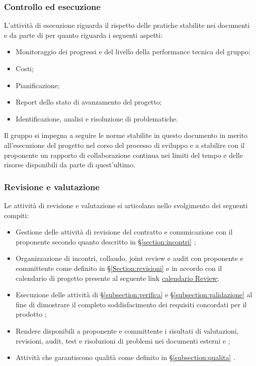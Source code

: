 \subsubsection{Controllo ed esecuzione}
L'attività di esecuzione riguarda il rispetto delle pratiche stabilite nei documenti \docNameVersionPdP{} e \docNameVersionPdQ{} da parte di \groupName{} per quanto riguarda i seguenti aspetti:
\begin{itemize}
	\item Monitoraggio dei progressi e del livello della performance tecnica del gruppo;
	\item Costi;
	\item Pianificazione;
	\item Report dello stato di avanzamento del progetto;
	\item Identificazione, analisi e risoluzione di problematiche.
\end{itemize}
Il gruppo si impegna a seguire le norme stabilite in questo documento in merito all'esecuzione del progetto nel corso del processo di sviluppo e a stabilire con il proponente \proposerName{} un rapporto di collaborazione continua nei limiti del tempo e delle risorse disponibili da parte di quest'ultimo.

\subsubsection{Revisione e valutazione}
Le attività di revisione e valutazione si articolano nello svolgimento dei seguenti compiti:
\begin{itemize}
\item Gestione delle attività di revisione del contratto e comunicazione con il proponente secondo quanto descritto in §\ref{section:incontri} ;
\item Organizzazione di incontri, collaudo, joint review e audit con proponente e committente come definito in §\ref{Section:revisioni}  e in accordo con il calendario di progetto presente al seguente link \href{https://www.math.unipd.it/~tullio/IS-1/2018/Dispense/P01.pdf}{calendario Review};
\item Esecuzione delle attività di §\ref{subsection:verifica}  e §\ref{subsection:validazione}  al fine di dimostrare il completo soddisfacimento dei requisiti concordati per il prodotto \projectName{};
\item Rendere disponibili a proponente e committente i risultati di valutazioni, revisioni, audit, test e risoluzioni di problemi nei documenti esterni \docNameVersionPdP{} e \docNameVersionPdQ{};
\item Attività che garantiscono qualità come definito in §\ref{subsection:qualita} .
\end{itemize}

